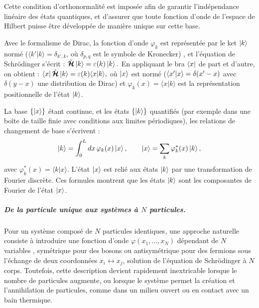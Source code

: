 \medskip

Cette condition d’orthonormalité est imposée afin de garantir l’indépendance linéaire des états quantiques, et d'assurer que toute fonction d’onde de l’espace de Hilbert puisse être développée de manière unique sur cette base. 


\medskip

Avec le formalisme de Dirac, la fonction d’onde $\varphi_k$ est représentée par le ket $\ket{k}$ normé (\ie $\langle k' \vert k \rangle = \delta_{k', k}$, où $\delta_{p,q}$ est le symbole de Kronecker)
, et l’équation de Schrödinger s’écrit :
\(
\hat{\bm{\mathcal{H}}} \ket{k} = \varepsilon(k) \ket{k}.
\)
En appliquant le bra $\bra{x}$ de part et d’autre, on obtient :
\(
\bra{x} \hat{\bm{\mathcal{H}}} \ket{k} = \varepsilon(k) \langle x \vert k \rangle,
\)
où $\ket{x}$ est normé (\ie $\braket{x'\vert x} = \delta ( x' - x ) $ avec $\delta ( y - x )$ une distribution de Dirac) et $\varphi_k(x) = \langle x \vert k \rangle$ est la représentation positionnelle de l’état $\ket{k}$.


\begin{mdframed}[
	linewidth=0.5pt, 
	backgroundcolor=gray!5, 
	roundcorner=50pt,	
	innerleftmargin=5pt,
    innerrightmargin=5pt,
    innertopmargin=1pt,
    innerbottommargin=2pt,
    leftmargin=2pt,
    rightmargin=2pt
	]
La base $\{\ket{x}\}$ étant continue, et les états $\{\ket{k}\}$ quantifiés (par exemple dans une boîte de taille finie avec conditions aux limites périodiques), les relations de changement de base s’écrivent :
\begin{eqnarray}\label{chap.1:eq.rapel.etat.prim.1}
	\ket{k} = \int_0^L dx \, \varphi_k(x) \ket{x}, \qquad   
	\ket{x} = \sum_k \varphi_k^\ast(x) \ket{k},
\end{eqnarray}
avec $\varphi_k^\ast(x) = \langle k \vert x \rangle$. L’état $\ket{x}$ est relié aux états $\ket{k}$ par une transformation de Fourier discrète. Ces formules montrent que les états $\ket{k}$ sont les composantes de Fourier de l’état $\ket{x}$.
\end{mdframed}


\subparagraph{De la particule unique aux systèmes à $N$ particules.}

Pour un système composé de $N$ particules identiques, une approche naturelle consiste à introduire une fonction d’onde $\varphi(x_1, \dots, x_N)$ dépendant de $N$ variables , symétrique pour des bosons ou antisymétrique pour des fermions sous l’échange de deux coordonnées $x_i \leftrightarrow x_j$, solution de l’équation de Schrödinger à $N$ corps. 
Toutefois, cette description devient rapidement inextricable lorsque le nombre de particules augmente, ou lorsque le système permet la création et l’annihilation de particules, comme dans un milieu ouvert ou en contact avec un bain thermique.


